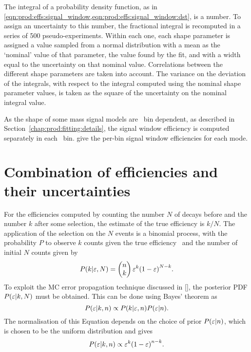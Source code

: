 The integral of a probability density function, as in \cref{eqn:prod:effs:signal_window,eqn:prod:effs:signal_window:dst}, is a number.
To assign an uncertainty to this number, the fractional integral is recomputed 
in a series of 500 pseudo-experiments.
Within each one, each shape parameter is assigned a value sampled from a 
normal distribution with a mean as the `nominal' value of that parameter, the 
value found by the fit, and with a width equal to the uncertainty on that nominal 
value. Correlations between the different shape parameters are taken into account.
The variance on the deviation of the integrals, with respect to the integral 
computed using the nominal shape parameter values, is taken as the square of 
the uncertainty on the nominal integral value.

As the shape of some mass signal models are \pTy\ bin dependent, as described 
in Section~\ref{chap:prod:fitting:details}, the signal window efficiency is computed 
separately in each \pTy\ bin.
give the per-bin signal window efficiencies for each mode.

\section{Combination of efficiencies and their uncertainties}
\label{chap:prod:effs:tot}


For the efficiencies computed by counting the number $N$ of decays before and the number $k$ after some selection, the estimate of the true efficiency is $k/N$.
The application of the selection on the $N$ events is a binomial process, with the probability $P$ to observe $k$ counts given the true efficiency \eff\ and the number of initial $N$ counts given by
\begin{equation}
  P(k | \varepsilon, N) = \begin{pmatrix}n\\k\end{pmatrix}\varepsilon^{k}{(1 - \varepsilon)}^{N - k}.
\end{equation}
To exploit the \acl{MC} error propagation technique discussed in \cref{}, the posterior \ac{PDF} $P(\varepsilon|k, N)$ must be obtained.
This can be done using Bayes' theorem as
\begin{equation}
  P(\varepsilon|k,n) \propto P(k|\varepsilon,n)P(\varepsilon|n).
\end{equation}
The normalisation of this Equation depends on the choice of prior $P(\varepsilon|n)$, which is chosen to be the uniform distribution and gives
\begin{equation}
  P(\varepsilon|k,n) \propto \varepsilon^{k}{(1 - \varepsilon)}^{n - k}.
\end{equation}

